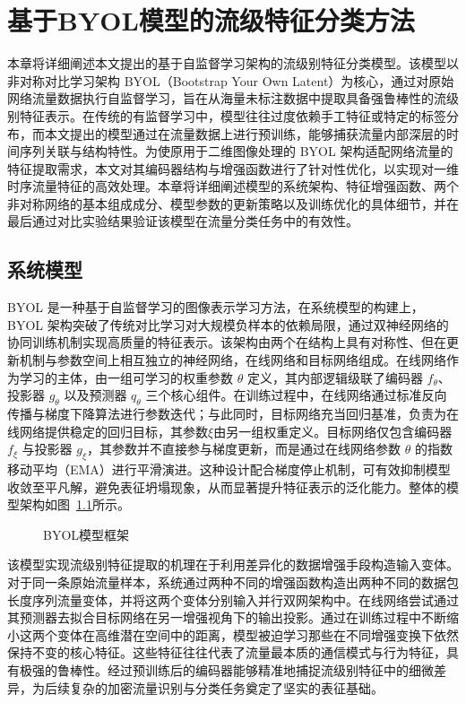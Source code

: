 
\chapter{基于BYOL模型的流级特征分类方法}
本章将详细阐述本文提出的基于自监督学习架构的流级别特征分类模型。该模型以非对称对比学习架构 BYOL（Bootstrap Your Own Latent）为核心，通过对原始网络流量数据执行自监督学习，旨在从海量未标注数据中提取具备强鲁棒性的流级别特征表示\cite{grill2020bootstrap}。在传统的有监督学习中，模型往往过度依赖手工特征或特定的标签分布，而本文提出的模型通过在流量数据上进行预训练，能够捕获流量内部深层的时间序列关联与结构特性。为使原用于二维图像处理的 BYOL 架构适配网络流量的特征提取需求，本文对其编码器结构与增强函数进行了针对性优化，以实现对一维时序流量特征的高效处理。本章将详细阐述模型的系统架构、特征增强函数、两个非对称网络的基本组成成分、模型参数的更新策略以及训练优化的具体细节，并在最后通过对比实验结果验证该模型在流量分类任务中的有效性。

\section{系统模型}
BYOL 是一种基于自监督学习的图像表示学习方法，在系统模型的构建上，BYOL 架构突破了传统对比学习对大规模负样本的依赖局限，通过双神经网络的协同训练机制实现高质量的特征表示。该架构由两个在结构上具有对称性、但在更新机制与参数空间上相互独立的神经网络，在线网络和目标网络组成。在线网络作为学习的主体，由一组可学习的权重参数 $\theta$ 定义，其内部逻辑级联了编码器 $f_\theta$、投影器 $g_\theta$ 以及预测器 $q_\theta$ 三个核心组件。在训练过程中，在线网络通过标准反向传播与梯度下降算法进行参数迭代；与此同时，目标网络充当回归基准，负责为在线网络提供稳定的回归目标，其参数$\xi $由另一组权重定义。目标网络仅包含编码器 $f_\xi$ 与投影器 $g_\xi$，其参数并不直接参与梯度更新，而是通过在线网络参数 $\theta$ 的指数移动平均（EMA）进行平滑演进。这种设计配合梯度停止机制，可有效抑制模型收敛至平凡解，避免表征坍塌现象，从而显著提升特征表示的泛化能力。整体的模型架构如图~\ref{fig:BYOL}所示。

\begin{figure}[ht]
  \centering
  \caption{BYOL模型框架}
  \label{fig:BYOL}
\end{figure}

该模型实现流级别特征提取的机理在于利用差异化的数据增强手段构造输入变体。对于同一条原始流量样本，系统通过两种不同的增强函数构造出两种不同的数据包长度序列流量变体，并将这两个变体分别输入并行双网架构中。在线网络尝试通过其预测器去拟合目标网络在另一增强视角下的输出投影。通过在训练过程中不断缩小这两个变体在高维潜在空间中的距离，模型被迫学习那些在不同增强变换下依然保持不变的核心特征。这些特征往往代表了流量最本质的通信模式与行为特征，具有极强的鲁棒性。经过预训练后的编码器能够精准地捕捉流级别特征中的细微差异，为后续复杂的加密流量识别与分类任务奠定了坚实的表征基础。

